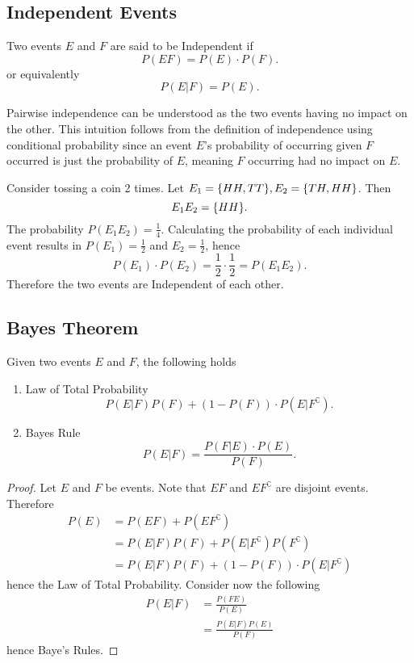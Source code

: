 \documentclass[../notes.tex]{subfiles}
\begin{document}

\subsection{Independent Events}
\begin{definition}
	Two events $E$ and $F$ are said to be Independent if
	\[
		P(EF) = P(E) \cdot P(F)
	.\]
	or equivalently
	\[
		P(E | F) = P(E)
	.\]
\end{definition}

Pairwise independence can be understood as the two events having no impact on the other. This intuition follows from the definition of independence using conditional probability since an event $E$'s probability of occurring given $F$ occurred is just the probability of $E$, meaning $F$ occurring had no impact on $E$.

\begin{example}
	Consider tossing a coin 2 times. Let $E_1 = \qty{HH, TT}, E_2 = \qty{TH, HH}$. Then \[
		E_1 E_2 = \qty{HH}
	.\]
	The probability $P(E_1 E_2) = \frac{1}{4}$. Calculating the probability of each individual event results in $P(E_1) = \frac{1}{2}$ and $E_2 = \frac{1}{2}$, hence
	\[
		P(E_1) \cdot P(E_2) = \frac{1}{2} \cdot \frac{1}{2} = P(E_1 E_2)
	.\]
	Therefore the two events are Independent of each other.
\end{example}

\subsection{Bayes Theorem}
\begin{theorem}
	Given two events $E$ and $F$, the following holds
	\begin{enumerate}
		\item Law of Total Probability
			\[
				P(E | F) P(F) + (1 - P(F))\cdot P(E | F^\complement)
			.\]
		\item Bayes Rule
			\[
				P(E | F) = \frac{P(F | E) \cdot P(E)}{P(F)}
			.\]
	\end{enumerate}
\end{theorem}
\begin{proof}
	Let $E$ and $F$ be events. Note that $EF$ and $EF^\complement$ are disjoint events. Therefore
	\begin{align*}
		P(E) &= P(EF) + P(EF^\complement) \\
				 &= P(E | F) P(F) + P(E | F^\complement) P(F^\complement) \\
				 &= P(E | F) P(F) + (1 - P(F))\cdot P(E | F^\complement)
	\end{align*}
	hence the Law of Total Probability. Consider now the following
	\begin{align*}
		P(E | F) &= \frac{P(FE)}{P(E)} \\
						 &= \frac{P(E | F) P(E)}{P(F)}
	\end{align*}
	hence Baye's Rules.
\end{proof}
	
\end{document}
